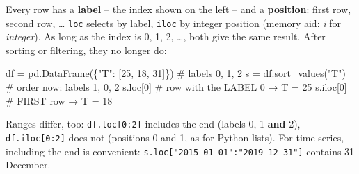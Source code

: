 \documentclass[
  letterpaper,
  DIV=11,
  numbers=noendperiod]{scrreprt}
\newenvironment{Shaded}{\begin{snugshade}}{\end{snugshade}}
\newcommand{\CommentTok}[1]{\textcolor[rgb]{0.37,0.37,0.37}{#1}}
\newcommand{\DecValTok}[1]{\textcolor[rgb]{0.68,0.00,0.00}{#1}}
\newcommand{\NormalTok}[1]{\textcolor[rgb]{0.00,0.23,0.31}{#1}}
\newcommand{\OperatorTok}[1]{\textcolor[rgb]{0.37,0.37,0.37}{#1}}
\newcommand{\StringTok}[1]{\textcolor[rgb]{0.13,0.47,0.30}{#1}}
\begin{document}
\begin{tcolorbox}[enhanced jigsaw, left=2mm, title=\textcolor{quarto-callout-tip-color}{\faLightbulb}\hspace{0.5em}{\texttt{loc} or \texttt{iloc}?}, opacityback=0, breakable, rightrule=.15mm, arc=.35mm, toptitle=1mm, colbacktitle=quarto-callout-tip-color!10!white, opacitybacktitle=0.6, coltitle=black, colframe=quarto-callout-tip-color-frame, bottomrule=.15mm, leftrule=.75mm, bottomtitle=1mm, titlerule=0mm, toprule=.15mm, colback=white]

Every row has a \textbf{label} -- the index shown on the left -- and a
\textbf{position}: first row, second row, \ldots{} \texttt{loc} selects
by label, \texttt{iloc} by integer position (memory aid: \emph{i} for
\emph{integer}). As long as the index is 0, 1, 2, \ldots, both give the
same result. After sorting or filtering, they no longer do:

\begin{Shaded}
\begin{Highlighting}[]
\NormalTok{df }\OperatorTok{=}\NormalTok{ pd.DataFrame(\{}\StringTok{"T"}\NormalTok{: [}\DecValTok{25}\NormalTok{, }\DecValTok{18}\NormalTok{, }\DecValTok{31}\NormalTok{]\})   }\CommentTok{\# labels 0, 1, 2}
\NormalTok{s }\OperatorTok{=}\NormalTok{ df.sort\_values(}\StringTok{"T"}\NormalTok{)                  }\CommentTok{\# order now: labels 1, 0, 2}
\NormalTok{s.loc[}\DecValTok{0}\NormalTok{]     }\CommentTok{\# row with the LABEL 0 → T = 25}
\NormalTok{s.iloc[}\DecValTok{0}\NormalTok{]    }\CommentTok{\# FIRST row            → T = 18}
\end{Highlighting}
\end{Shaded}

Ranges differ, too: \texttt{df.loc{[}0:2{]}} includes the end (labels 0,
1 \textbf{and} 2), \texttt{df.iloc{[}0:2{]}} does not (positions 0 and
1, as for Python lists). For time series, including the end is
convenient: \texttt{s.loc{[}"2015-01-01":"2019-12-31"{]}} contains 31
December.

\end{tcolorbox}
\end{document}
